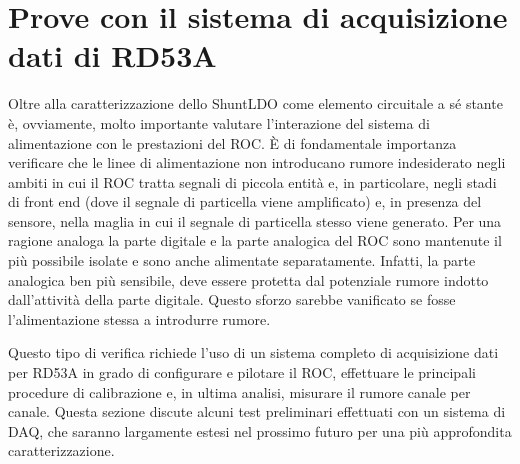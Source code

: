 
\section{Prove con il sistema di acquisizione dati di RD53A}

Oltre alla caratterizzazione dello ShuntLDO come elemento circuitale a sé stante \`e, ovviamente, molto importante valutare l'interazione del sistema di alimentazione con le prestazioni del ROC. \`E di fondamentale importanza verificare che le linee di alimentazione non introducano rumore indesiderato negli ambiti in cui il ROC tratta segnali di piccola entit\`a e, in particolare, negli stadi di front end (dove il segnale di particella viene amplificato) e, in presenza del sensore, nella maglia in cui il segnale di particella stesso viene generato. 
Per una ragione analoga la parte digitale e la parte analogica del ROC sono mantenute il pi\`u possibile isolate e sono anche alimentate separatamente. Infatti, la parte analogica ben più sensibile, deve essere protetta dal potenziale rumore indotto dall'attività della parte digitale. Questo sforzo sarebbe vanificato se fosse l'alimentazione stessa a introdurre rumore.

Questo tipo di verifica richiede l'uso di un sistema completo di acquisizione dati per RD53A in grado di configurare e pilotare il ROC, effettuare le principali procedure di calibrazione e, in ultima analisi, misurare il rumore canale per canale. Questa sezione discute alcuni test preliminari effettuati con un sistema di DAQ, che saranno largamente estesi nel prossimo futuro per una più approfondita caratterizzazione.

